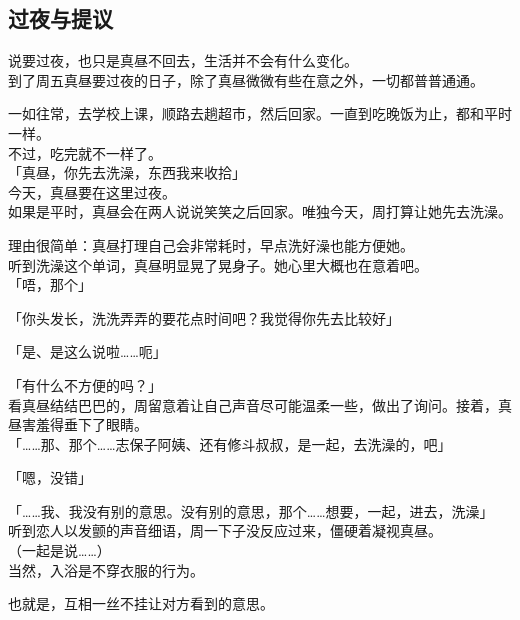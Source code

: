 \subsection{过夜与提议}

说要过夜，也只是真昼不回去，生活并不会有什么变化。\\

到了周五真昼要过夜的日子，除了真昼微微有些在意之外，一切都普普通通。

一如往常，去学校上课，顺路去趟超市，然后回家。一直到吃晚饭为止，都和平时一样。\\

不过，吃完就不一样了。\\

「真昼，你先去洗澡，东西我来收拾」\\

今天，真昼要在这里过夜。\\

如果是平时，真昼会在两人说说笑笑之后回家。唯独今天，周打算让她先去洗澡。

理由很简单：真昼打理自己会非常耗时，早点洗好澡也能方便她。\\

听到洗澡这个单词，真昼明显晃了晃身子。她心里大概也在意着吧。\\

「唔，那个」

「你头发长，洗洗弄弄的要花点时间吧？我觉得你先去比较好」

「是、是这么说啦……呃」

「有什么不方便的吗？」\\

看真昼结结巴巴的，周留意着让自己声音尽可能温柔一些，做出了询问。接着，真昼害羞得垂下了眼睛。\\

「……那、那个……志保子阿姨、还有修斗叔叔，是一起，去洗澡的，吧」

「嗯，没错」

「……我、我没有别的意思。没有别的意思，那个……想要，一起，进去，洗澡」\\

听到恋人以发颤的声音细语，周一下子没反应过来，僵硬着凝视真昼。\\

（一起是说……）\\

当然，入浴是不穿衣服的行为。

也就是，互相一丝不挂让对方看到的意思。\\

